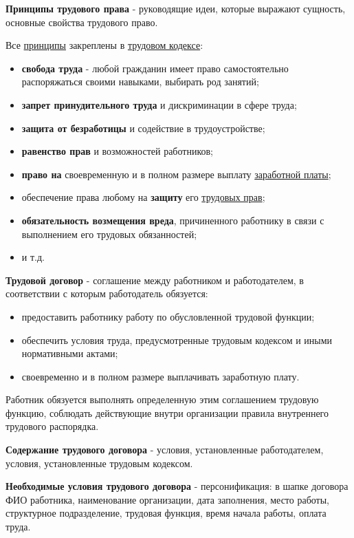 \documentclass[a5paper,10pt]{article}
\begin{document}
		\textbf{Принципы трудового права} - руководящие идеи, которые выражают сущность, основные свойства трудового право.

		Все \underline{принципы} закреплены в \underline{трудовом кодексе}:
		\begin{itemize}
			\item \textbf{свобода труда} - любой гражданин имеет право самостоятельно распоряжаться своими навыками, выбирать род занятий;
			\item \textbf{запрет принудительного труда} и дискриминации в сфере труда;
			\item \textbf{защита от безработицы} и содействие в трудоустройстве;
			\item \textbf{равенство прав} и возможностей работников;
			\item \textbf{право на} своевременную и в полном размере выплату \underline{заработной платы};
			\item обеспечение права любому на \textbf{защиту} его \underline{трудовых прав};
			\item \textbf{обязательность возмещения вреда}, причиненного работнику в связи с выполнением его трудовых обязанностей;
			\item и т.д.
		\end{itemize}

		\textbf{Трудовой договор} - соглашение между работником и работодателем, в соответствии с которым работодатель обязуется:
		\begin{itemize}
			\item предоставить работнику работу по обусловленной трудовой функции;
			\item обеспечить условия труда, предусмотренные трудовым кодексом и иными нормативными актами;
			\item своевременно и в полном размере выплачивать заработную плату.
		\end{itemize}
		Работник обязуется выполнять определенную этим соглашением трудовую функцию, соблюдать действующие внутри организации правила внутреннего трудового распорядка.

		\textbf{Содержание трудового договора} - условия, установленные работодателем, условия, установленные трудовым кодексом.

		\textbf{Необходимые условия трудового договора} - персонификация: в шапке договора ФИО работника, наименование организации, дата заполнения, место работы, структурное подразделение, трудовая функция, время начала работы, оплата труда.
\end{document}
